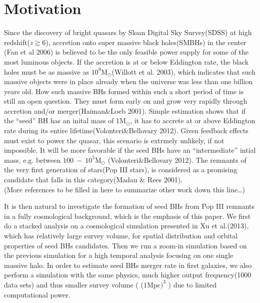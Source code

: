 \documentclass[useAMS,usenatbib]{mn2e}
\begin{document}
\section{Motivation}
Since the discovery of bright quasars by Sloan Digital Sky Survey(SDSS) at high
redshift(\textit{z}$\gtrsim$6), accretion onto super massive black holes(SMBHs) in the center
(Fan et al 2006) is believed to be the only feasible power supply for some of 
the most luminous objects. If the accretion is at or below Eddington rate, the
black holes must be as massive as $10^9\mbox{M}_{\odot}$(Willott et al. 2003),
which indicates that such massive objects were in place already when the
universe was less than one billion years old. How such massive BHs formed within
such a short period of time is still an open question. They must form early on
and grow very rapidly through accretion and/or merger(Haiman\&Loeb 2001). Simple
estimation shows that if the
``seed'' BH has an inital mass of $1\mbox{M}_{\odot}$, it has to accrete at or
above Eddington rate during its entire lifetime(Volonteri\&Bellovary 2012). 
Given feedback effects must exist to power the quasar, this scenario is extrmely
unlikely, if not impossible. It will be more favorable if the seed BHs have an
``intermediate'' intial mass, e.g. between $100\ -\ 10^5\mbox{M}_\odot$
(Volonteri\&Bellovary 2012). The remnants of the very first generation of
stars(Pop III stars), is considered as a promising candidate that falls in this
category(Madau \& Rees 2001). \\

(More references to be filled in here to summarize other work down this
line\dots)

It is then natural to investigate the formation of seed BHs from Pop III
remnants in a fully cosmological background, which is the emphasis of this
paper. We first do a stacked analysis on a cosmological simulation
presented in Xu et al.(2013), which has relatively large survey volume, for
spatial distribution and orbital properties of seed BHs candidates. Then we run
a zoom-in simulation based on the previous simulation for a high temporal
analysis focusing on one single massive halo. In order to estimate seed BHs
merger rate in first galaxies, we also perform a simulation with the same
physics, much higher output frequency(1000 data sets) and thus smaller survey
volume ( ($1\mbox{Mpc})^3$ ) due to limited computational power. 
\end{document}
